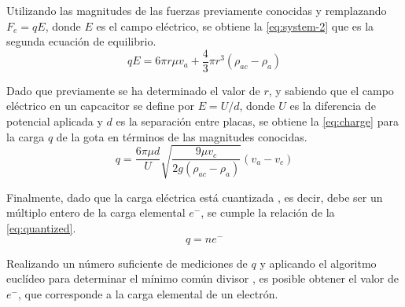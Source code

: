 Utilizando las magnitudes de las fuerzas previamente conocidas y remplazando
\(F_e=qE \), donde $E$ es el campo eléctrico, se obtiene la \cref{eq:system-2}
que es la segunda ecuación de equilibrio.
\begin{equation}\label{eq:system-2}
    qE = 6\pi r\mu v_a + \frac{4}{3}\pi r^3(\rho_{ac}-\rho_a)
\end{equation}

Dado que previamente se ha determinado el valor de \(r\), y sabiendo que el campo
eléctrico en un capcacitor se define por \( E = U / d \), donde $U$ es la
diferencia de potencial aplicada y $d$ es la separación entre placas, se obtiene
la \cref{eq:charge} para la carga \(q\) de la gota en términos de las magnitudes
conocidas.
\begin{equation}\label{eq:charge}
    q = \frac{6\pi \mu d}{U}\sqrt{\frac{9\mu v_c}{2g(\rho_{ac}-\rho_a)}}(v_a-v_c)
\end{equation}

Finalmente, dado que la carga eléctrica está cuantizada \cite{millikan-1913},
es decir, debe ser un múltiplo entero de la carga elemental \(e^{-}\),
se cumple la relación de la \cref{eq:quantized}.
\begin{equation}\label{eq:quantized}
    q=ne^-
\end{equation}

Realizando un número suficiente de mediciones de \(q\) y aplicando el algoritmo
euclídeo para determinar el mínimo común divisor
\cite{wikipedia-contributors-2024}, es posible obtener el valor de \(e^{-}\),
que corresponde a la carga elemental de un electrón.
